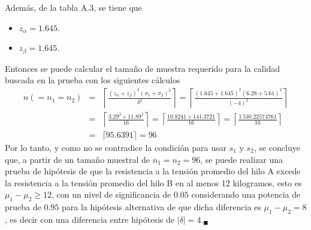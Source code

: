 \begin{solucion}
\begin{itemize}
 \end{itemize}
 Adem\'as, de la tabla A.3, se tiene que
 \begin{itemize}
  \item $z_{\alpha} = 1.645$.
  \item $z_{\beta} = 1.645$.
 \end{itemize}
 Entonces se puede calcular el tama\~no de muestra
 requerido para la calidad buscada en la prueba
 con los siguientes c\'alculos
 \begin{eqnarray*}
  n (=n_1=n_2) & = & \left\lceil \frac{\left( z_{\alpha} + z_{\beta} \right)^2\left( \sigma_1 + \sigma_2 \right)^2}{\delta^2} \right\rceil = \left\lceil \frac{(1.645 + 1.645)^2(6.28 + 5.61)^2}{(-4)^2} \right\rceil \\
  & = & \left\lceil \frac{3.29^2\times 11.89^2}{16} \right\rceil 
  = \left\lceil \frac{ 10.8241 \times 141.3721}{16} \right\rceil
  = \left\lceil \frac{1\,530.22574761}{16} \right\rceil \\
  & = & \lceil 95.6391 \rceil = 96
 \end{eqnarray*}
 Por lo tanto, y como no se contradice la condici\'on para usar $s_1$ y $s_2$,
 se concluye que, a partir de un tama\~no muestral de $n_1 = n_2 = 96$,
 se puede realizar una prueba de hip\'otesis de que
 la resistencia a la tensi\'on promedio del hilo A excede la resistencia
 a la tensi\'on promedio del hilo B en al menos 12 kilogramos,
 esto es $\mu_1 - \mu_2 \geq 12$, con un nivel de significancia de $0.05$
 considerando una potencia de prueba de $0.95$ para la hip\'otesis alternativa
 de que dicha diferencia es $\mu_1 - \mu_2 = 8$,
 es decir con una diferencia entre hip\'otesis de $|\delta| = 4$.${}_{\blacksquare}$
\end{solucion}

